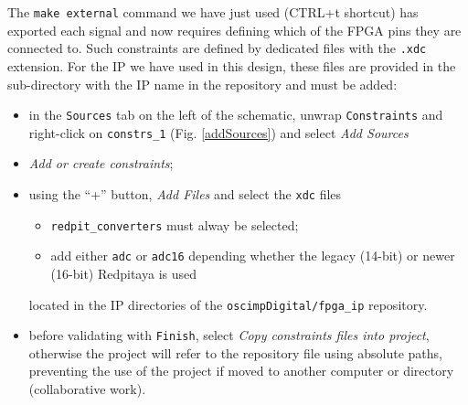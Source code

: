 \documentclass[10pt,oneside]{article}
\begin{document}

The {\tt make external} command we have just used (CTRL+t shortcut) has exported
each signal and now requires defining which of the FPGA pins they are connected to.
Such constraints are defined by dedicated files with the {\tt .xdc} extension. For the
IP we have used in this design, these files are provided in the sub-directory with the
IP name in the repository and must be added:
\begin{itemize}
\item in the {\tt Sources} tab on the left of the schematic, unwrap {\tt Constraints} 
and right-click on {\tt constrs\_1} (Fig. \ref{addSources}) and select {\em Add Sources}
\item {\em Add or create constraints};
\item using the ``+'' button, {\em Add Files} and select the {\tt xdc} files
	\begin{itemize}
\item {\tt redpit\_converters} must alway be selected;
\item add either {\tt adc} or {\tt adc16} depending whether the legacy (14-bit) or newer (16-bit)
Redpitaya is used %
	\end{itemize}
located in the IP directories of the {\tt oscimpDigital/fpga\_ip} repository.
\item before validating with {\tt Finish}, select {\em Copy constraints
files into project}, otherwise the project will refer to the repository file
using absolute paths, preventing the use of the project if moved to another
computer or directory (collaborative work).
\end{itemize}
\end{document}
